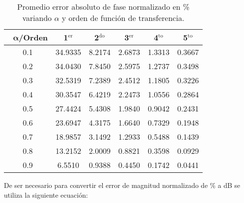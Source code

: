 \begin{table}[!ht]                                 
\centering            
\caption{Promedio error absoluto de fase normalizado en \% variando $\alpha$ y orden de función de transferencia.}                           
\label{tab:prom_error_fase_norm}                               
\begin{tabular}{cccccc}
\hline                                             
$\,\,\,\,\bm{\alpha}$\textbf{/Orden} & \textbf{1$^{\mathrm{er}}$} & \textbf{2$^{\mathrm{do}}$} & \textbf{3$^{\mathrm{er}}$} & \textbf{4$^{\mathrm{to}}$} & \textbf{5$^{\mathrm{to}}$} \\                     
\hline                                             
0.1 & 34.9335 & 8.2174 & 2.6873 & 1.3313 & 0.3667 \\
                                              
0.2 & 34.0430 & 7.8450 & 2.5975 & 1.2737 & 0.3498 \\
                                           
0.3 & 32.5319 & 7.2389 & 2.4512 & 1.1805 & 0.3226 \\
                                              
0.4 & 30.3547 & 6.4219 & 2.2473 & 1.0556 & 0.2864 \\
                                            
0.5 & 27.4424 & 5.4308 & 1.9840 & 0.9042 & 0.2431 \\
                                          
0.6 & 23.6947 & 4.3175 & 1.6640 & 0.7329 & 0.1948 \\
                                             
0.7 & 18.9857 & 3.1492 & 1.2933 & 0.5488 & 0.1439 \\
                                           
0.8 & 13.2152 & 2.0009 & 0.8821 & 0.3598 & 0.0929 \\
                                              
0.9 & 6.5510 & 0.9388 & 0.4450 & 0.1742 & 0.0441 \\ 
\hline                                             
\end{tabular}                                                             
\end{table}


	De ser necesario para convertir el error de magnitud normalizado de \% a dB se utiliza la siguiente ecuación:
	
